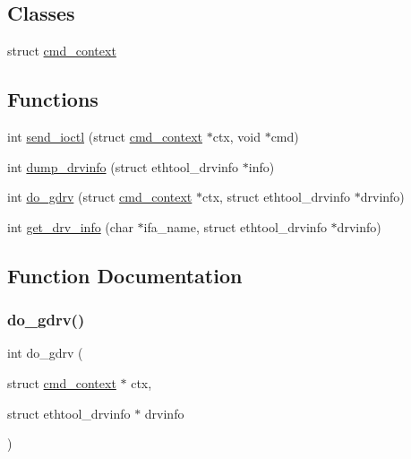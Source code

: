 \subsection*{Classes}
\begin{DoxyCompactItemize}
\item 
struct \hyperlink{structcmd__context}{cmd\+\_\+context}
\end{DoxyCompactItemize}
\subsection*{Functions}
\begin{DoxyCompactItemize}
\item 
int \hyperlink{ethtool-info_8h_a6d58a8ebd8093edbe407365d8f3e93e5}{send\+\_\+ioctl} (struct \hyperlink{structcmd__context}{cmd\+\_\+context} $\ast$ctx, void $\ast$cmd)
\item 
int \hyperlink{ethtool-info_8h_a972c7feb6f25da37144ec7933d787147}{dump\+\_\+drvinfo} (struct ethtool\+\_\+drvinfo $\ast$info)
\item 
int \hyperlink{ethtool-info_8h_a92defcf2493dee90aeaac81e3b15572c}{do\+\_\+gdrv} (struct \hyperlink{structcmd__context}{cmd\+\_\+context} $\ast$ctx, struct ethtool\+\_\+drvinfo $\ast$drvinfo)
\item 
int \hyperlink{ethtool-info_8h_af4d8c485fa8cc199f6e1f27e949c9dc4}{get\+\_\+drv\+\_\+info} (char $\ast$ifa\+\_\+name, struct ethtool\+\_\+drvinfo $\ast$drvinfo)
\end{DoxyCompactItemize}


\subsection{Function Documentation}
\mbox{\label{ethtool-info_8h_a92defcf2493dee90aeaac81e3b15572c}} 
\subsubsection{\texorpdfstring{do\+\_\+gdrv()}{do\_gdrv()}}
{\footnotesize\ttfamily int do\+\_\+gdrv (\begin{DoxyParamCaption}\item[{struct \hyperlink{structcmd__context}{cmd\+\_\+context} $\ast$}]{ctx,  }\item[{struct ethtool\+\_\+drvinfo $\ast$}]{drvinfo }\end{DoxyParamCaption})}

